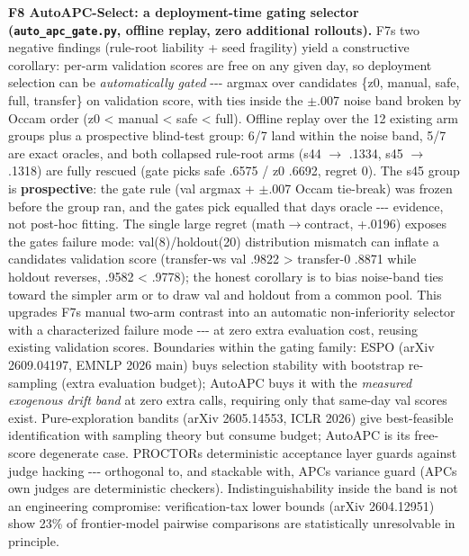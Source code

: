 \textbf{F8 AutoAPC-Select: a deployment-time gating selector (\texttt{auto\_apc\_gate.py}, offline replay, zero additional rollouts).} F7\textquotesingle s two negative findings (rule-root liability + seed fragility) yield a constructive corollary: per-arm validation scores are free on any given day, so deployment selection can be \emph{automatically gated} -\/-\/- argmax over candidates \{z0, manual, safe, full, transfer\} on validation score, with ties inside the \(\pm\).007 noise band broken by Occam order (z0 \textless{} manual \textless{} safe \textless{} full). Offline replay over the 12 existing arm groups plus a prospective blind-test group: 6/7 land within the noise band, 5/7 are exact oracles, and both collapsed rule-root arms (s44 \(\rightarrow\) .1334, s45 \(\rightarrow\) .1318) are fully rescued (gate picks safe .6575 / z0 .6692, regret 0). The s45 group is \textbf{prospective}: the gate rule (val argmax + \(\pm\).007 Occam tie-break) was frozen before the group ran, and the gate\textquotesingle s pick equalled that day\textquotesingle s oracle -\/-\/- evidence, not post-hoc fitting. The single large regret (math\(\rightarrow\)contract, +.0196) exposes the gate\textquotesingle s failure mode: val(8)/holdout(20) distribution mismatch can inflate a candidate\textquotesingle s validation score (transfer-ws val .9822 \textgreater{} transfer-0 .8871 while holdout reverses, .9582 \textless{} .9778); the honest corollary is to bias noise-band ties toward the simpler arm or to draw val and holdout from a common pool. This upgrades F7\textquotesingle s manual two-arm contrast into an automatic non-inferiority selector with a characterized failure mode -\/-\/- at zero extra evaluation cost, reusing existing validation scores. Boundaries within the gating family: ESPO (arXiv 2609.04197, EMNLP 2026 main) buys selection stability with bootstrap re-sampling (extra evaluation budget); AutoAPC buys it with the \emph{measured exogenous drift band} at zero extra calls, requiring only that same-day val scores exist. Pure-exploration bandits (arXiv 2605.14553, ICLR 2026) give best-feasible identification with sampling theory but consume budget; AutoAPC is its free-score degenerate case. PROCTOR\textquotesingle s deterministic acceptance layer guards against judge hacking -\/-\/- orthogonal to, and stackable with, APC\textquotesingle s variance guard (APC\textquotesingle s own judges are deterministic checkers). Indistinguishability inside the band is not an engineering compromise: verification-tax lower bounds (arXiv 2604.12951) show 23\% of frontier-model pairwise comparisons are statistically unresolvable in principle.

